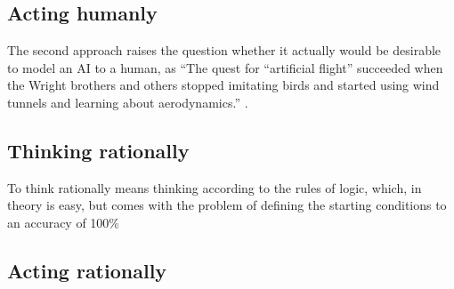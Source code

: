 \subsection{Acting humanly}
The second approach raises the question whether it actually would be desirable
to model an AI to a human, as “The quest for “artificial flight” succeeded when the Wright brothers and others stopped imitating birds and started using wind tunnels and learning about aerodynamics.” \cite[page 3]{russellArtificialIntelligenceModern2010}. 
\subsection{Thinking rationally}
To think rationally means thinking according to the rules of logic, which, in theory is easy, but comes with the problem of defining the starting conditions to an accuracy of 100\% 
\subsection{Acting rationally}